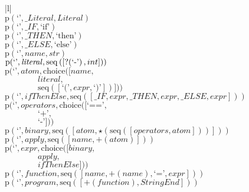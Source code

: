 \footnotesize\begin{center}\begin{tabular}{|l|}\hline
{}
\\\hline
$\mathrm{p}(\text{`'},\mathit{\_ Literal},\mathit{Literal})$	\\
$\mathrm{p}(\text{`'},\mathit{\_ IF},\text{`if'})$	\\
$\mathrm{p}(\text{`'},\mathit{\_ THEN},\text{`then'})$	\\
$\mathrm{p}(\text{`'},\mathit{\_ ELSE},\text{`else'})$	\\
$\mathrm{p}(\text{`'},\mathit{name},str)$	\\
$\mathrm{p}(\text{`'},\mathit{literal},\mathrm{seq}\left(\left[\mathord{?}\! \left(\text{`-'}\right), int\right]\right))$	\\
$\mathrm{p}(\text{`'},\mathit{atom},\mathrm{choice}([\mathit{name},$\\$\qquad\qquad\mathit{literal},$\\$\qquad\qquad\mathrm{seq}\left(\left[\text{`('}, \mathit{expr}, \text{`)'}\right]\right)]))$	\\
$\mathrm{p}(\text{`'},\mathit{ifThenElse},\mathrm{seq}\left(\left[\mathit{\_ IF}, \mathit{expr}, \mathit{\_ THEN}, \mathit{expr}, \mathit{\_ ELSE}, \mathit{expr}\right]\right))$	\\
$\mathrm{p}(\text{`'},\mathit{operators},\mathrm{choice}([\text{`=='},$\\$\qquad\qquad\text{`+'},$\\$\qquad\qquad\text{`-'}]))$	\\
$\mathrm{p}(\text{`'},\mathit{binary},\mathrm{seq}\left(\left[\mathit{atom}, \star \left(\mathrm{seq}\left(\left[\mathit{operators}, \mathit{atom}\right]\right)\right)\right]\right))$	\\
$\mathrm{p}(\text{`'},\mathit{apply},\mathrm{seq}\left(\left[\mathit{name}, \plus \left(\mathit{atom}\right)\right]\right))$	\\
$\mathrm{p}(\text{`'},\mathit{expr},\mathrm{choice}([\mathit{binary},$\\$\qquad\qquad\mathit{apply},$\\$\qquad\qquad\mathit{ifThenElse}]))$	\\
$\mathrm{p}(\text{`'},\mathit{function},\mathrm{seq}\left(\left[\mathit{name}, \plus \left(\mathit{name}\right), \text{`='}, \mathit{expr}\right]\right))$	\\
$\mathrm{p}(\text{`'},\mathit{program},\mathrm{seq}\left(\left[\plus \left(\mathit{function}\right), \mathit{StringEnd}\right]\right))$	\\
\hline\end{tabular}\end{center}

